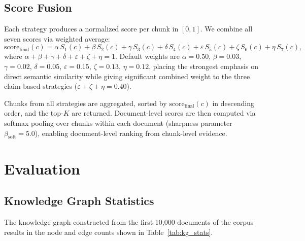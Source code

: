 \documentclass[10pt]{article}
\begin{document}
\subsection{Score Fusion}

Each strategy produces a normalized score per chunk in $[0,1]$. We combine all seven scores via weighted average:
\[
\text{score}_{\text{final}}(c) = \alpha \, S_1(c) + \beta \, S_2(c) + \gamma \, S_3(c) + \delta \, S_4(c) + \varepsilon \, S_5(c) + \zeta \, S_6(c) + \eta \, S_7(c),
\]
where $\alpha + \beta + \gamma + \delta + \varepsilon + \zeta + \eta = 1$. Default weights are $\alpha=0.50$, $\beta=0.03$, $\gamma=0.02$, $\delta=0.05$, $\varepsilon=0.15$, $\zeta=0.13$, $\eta=0.12$, placing the strongest emphasis on direct semantic similarity while giving significant combined weight to the three claim-based strategies ($\varepsilon + \zeta + \eta = 0.40$).

Chunks from all strategies are aggregated, sorted by $\text{score}_{\text{final}}(c)$ in descending order, and the top-$K$ are returned. Document-level scores are then computed via softmax pooling over chunks within each document (sharpness parameter $\beta_{\text{soft}}=5.0$), enabling document-level ranking from chunk-level evidence.

\section{Evaluation}
\label{sec:results}

\subsection{Knowledge Graph Statistics}

The knowledge graph constructed from the first 10,000 documents of the corpus results in the node and edge counts shown in Table~\ref{tab:kg_stats}.
\end{document}

